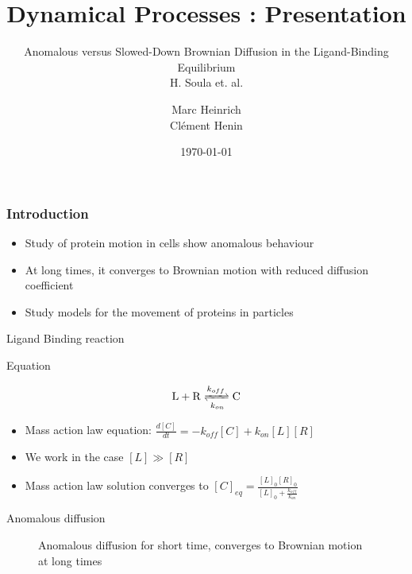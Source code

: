 \documentclass{beamer}
\title{Dynamical Processes : Presentation}
\subtitle{Anomalous versus Slowed-Down Brownian Diffusion
in the Ligand-Binding Equilibrium \\ H. Soula et. al.}
\author{Marc Heinrich \\ Clément Henin}
\date\today
\begin{document}
\begin{frame}
\maketitle
\end{frame}

\begin{frame}
\frametitle{Introduction}
	
\begin{itemize}
\itemsep2em
\item Study of protein motion in cells show anomalous behaviour
\item At long times, it converges to Brownian motion with reduced diffusion coefficient
\item Study models for the movement of proteins in particles
\end{itemize}
\end{frame}

\begin{frame}{Ligand Binding reaction}
\begin{block}{Equation}

\begin{align*}
\mathrm{L+R} \xrightleftharpoons[k_{on}]{k_{off}} \mathrm{C}
\end{align*}
\end{block}

\pause

\begin{itemize}
\itemsep1em
\item Mass action law equation: $\frac{d[C]}{dt} = - k_{off}[C] + k_{on}[L][R] $ 
\pause
\item We work in the case $[L] \gg [R]$
\item Mass action law solution converges to $[C]_{eq} = \frac{[L]_0 [R]_0}{[L]_0 + \frac{k_{off}}{k_{on}}}$ 
\end{itemize}
\end{frame}

\begin{frame}{Anomalous diffusion}

\begin{figure}
\caption{Anomalous diffusion for short time, converges to Brownian motion at long times}
\end{figure}

\end{frame}
\end{document}
